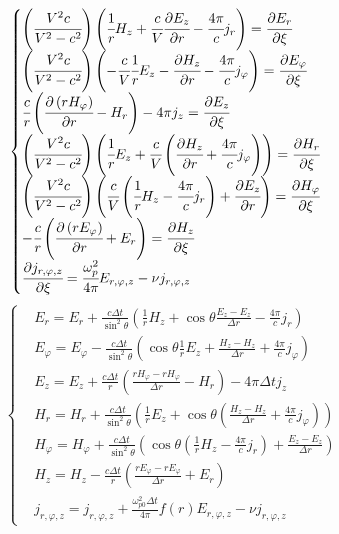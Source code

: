 \documentclass[a4paper]{article}
\begin{document}
	\fontsize{16}{24pt}\selectfont	

	\begin{equation*}
		\begin{cases}
			\left(\cfrac{V^{2}c}{V^{2}-c^{2}}\right)\left(\cfrac{1}{r}H_{z}+\cfrac{c}{V}\cfrac{\partial E_{z}}{\partial r}-\cfrac{4\pi}{c}j_{r}\right)=\cfrac{\partial E_{r}}{\partial\xi}\\
			
			\left(\cfrac{V^{2}c}{V^{2}-c^{2}}\right)\left(-\cfrac{c}{V}\cfrac{1}{r}E_{z}-\cfrac{\partial H_{z}}{\partial r}-\cfrac{4\pi}{c}j_{\varphi}\right)=\cfrac{\partial E_{\varphi}}{\partial\xi}\\		
			
			\cfrac{c}{r}\left(\cfrac{\partial\left(r H_{\varphi}\right)}{\partial r}-H_{r}\right)-{4\pi}j_{z}=\cfrac{\partial E_{z}}{\partial\xi}\\
			
			\left(\cfrac{V^{2}c}{V^{2}-c^{2}}\right)\left(\cfrac{1}{r}E_{z}+\cfrac{c}{V}\left(\cfrac{\partial H_{z}}{\partial r}+\cfrac{4\pi}{c}j_{\varphi}\right)\right)=\cfrac{\partial H_{r}}{\partial\xi}\\
			
			\left(\cfrac{V^{2}c}{V^{2}-c^{2}}\right)\left(\cfrac{c}{V}\left(\cfrac{1}{r}H_{z}-\cfrac{4\pi}{c}j_{r}\right)+\cfrac{\partial E_{z}}{\partial r}\right)=\cfrac{\partial H_{\varphi}}{\partial\xi}\\
			
			-\cfrac{c}{r}\left(\cfrac{\partial\left(r E_{\varphi}\right)}{\partial r}+E_{r}\right)=\cfrac{\partial H_{z}}{\partial\xi}\\
			
			\cfrac{\partial j_{r,\varphi,z}}{\partial\xi}=\cfrac{\omega_{p}^{2}}{4\pi}E_{r,\varphi,z}-\nu j_{r,\varphi,z}
		\end{cases}
	\end{equation*}
	\begin{equation*}
		\left\{
		\begin{split}
			&E_{r}=E_{r}+\frac{c\Delta t}{\sin^{2}\theta}\left(\frac{1}{r}H_{z}+\cos\theta\frac{E_{z}-E_{z}}{\Delta r}-\frac{4\pi}{c}j_{r}\right)\\
			&E_{\varphi}=E_{\varphi}-\frac{c\Delta t}{\sin^{2}\theta}\left(\cos\theta\frac{1}{r}E_{z}+\frac{H_{z}-H_{z}}{\Delta r}+\frac{4\pi}{c}j_{\varphi}\right)\\
			&E_{z}=E_{z}+\frac{c\Delta t}{r}\left(\frac{rH_{\varphi}-rH_{\varphi}}{\Delta r}-H_{r}\right)-4\pi\Delta tj_{z}\\
			&H_{r}=H_{r}+\frac{c\Delta t}{\sin^{2}\theta}\left(\frac{1}{r}E_{z}+\cos\theta\left(\frac{H_{z}-H_{z}}{\Delta r}+\frac{4\pi}{c}j_{\varphi}\right)\right)\\
			&H_{\varphi}=H_{\varphi}+\frac{c\Delta t}{\sin^{2}\theta}\left(\cos\theta\left(\frac{1}{r}H_{z}-\frac{4\pi}{c}j_{r}\right)+\frac{E_{z}-E_{z}}{\Delta r}\right)\\
			&H_{z}=H_{z}-\frac{c\Delta t}{r}\left(\frac{rE_{\varphi}-rE_{\varphi}}{\Delta r}+E_{r}\right)\\
			&j_{r,\varphi,z}=j_{r,\varphi,z}+\frac{\omega_{p0}^{2}\Delta t}{4\pi}f(r)E_{r,\varphi,z}-\nu j_{r,\varphi,z}
		\end{split}\right.
	\end{equation*}
\end{document}

